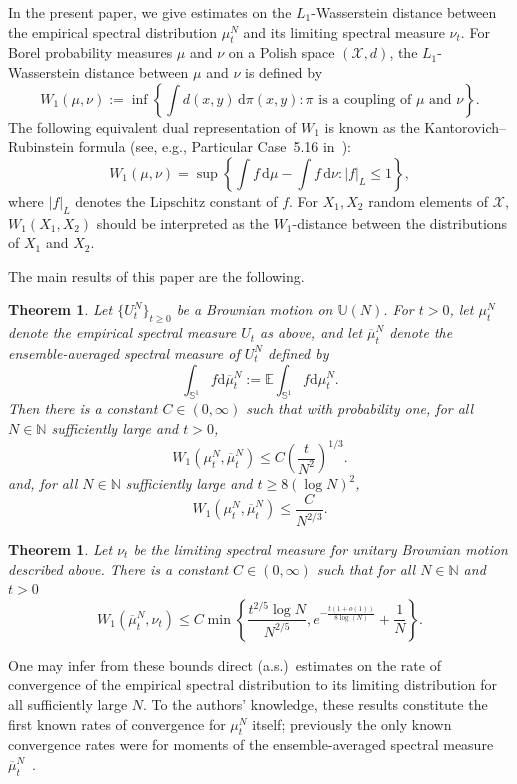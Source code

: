 \documentclass[11pt]{article}
\newtheorem{thm}[theo]{Theorem}
\theoremstyle{definition}
\numberwithin{equation}{section}
\numberwithin{figure}{section}
\numberwithin{table}{section}
\newcommand{\Circle}{\mathbb{S}^1}
\newcommand{\E}{\mathbb{E}}
\newcommand*{\dd}{\mathrm{d}}
\newcommand*{\dmu}{\dd \mu}
\newcommand*{\dbmu}{\dd \overline{\mu}}
\begin{document}
In the present paper, we give estimates on the $L_1$-Wasserstein distance between the empirical spectral distribution $\mu_t^N$ and its limiting spectral measure $\nu_t$. For Borel probability measures $\mu$ and $\nu$ on a Polish space $(\mathcal{X},d)$, the $L_1$-Wasserstein distance between $\mu$ and $\nu$ is defined by
\[
W_1(\mu,\nu):=\inf \left\{\int d(x,y)\,\dd\pi(x,y): \pi \text{ is a coupling of } \mu \text{ and } \nu\right\}.
\]
The following equivalent dual representation of $W_1$ is known as the Kantorovich--Rubinstein formula (see, e.g., Particular Case~5.16 in~\cite{Vil}):
\[
W_1(\mu,\nu) = \sup \left\{\int f\,\dmu -\int f\,\dd\nu : |f|_{L}\le1 \right\},
\]
where $|f|_L$ denotes the Lipschitz constant of $f$. For $X_1,X_2$ random elements of $\mathcal{X}$, $W_1(X_1,X_2)$ should be interpreted as the $W_1$-distance between the distributions of $X_1$ and $X_2$.


The main results of this paper are the following.
\begin{thm}\label{T:main}
Let $\{U^N_t\}_{t\ge0}$ be a Brownian motion on $\mathbb{U}(N)$. For $t>0$, let $\mu_t^N$ denote the empirical spectral measure $U_t$ as above, and let $\overline{\mu}_t^N$ denote the ensemble-averaged spectral measure of $U^N_t$ defined by
\[
\int_{\Circle}f\dbmu^N_t:=\E\int_{\Circle}f\dmu^N_t.
\]
Then there is a constant $C\in(0,\infty)$ such that with probability one, for all $N\in\mathbb{N}$ sufficiently large and $t>0$,
\[
W_1(\mu^N_{t},\overline{\mu}^N_{t})\le C\left(\frac{t}{N^2}\right)^{1/3}.
\]
and, for all $N\in\mathbb{N}$ sufficiently large and $t\ge 8(\log N)^2$,
\[
W_1(\mu^N_{t},\overline{\mu}^N_{t})\le \frac{C}{N^{2/3}}.
\]
\end{thm}

\begin{thm}\label{T:main-nu-t}
Let $\nu_t$ be the limiting spectral measure for unitary Brownian motion described above. There is a constant $C\in(0,\infty)$ such that for all $N\in\mathbb{N}$ and $t>0$
\[
W_1(\overline{\mu}_t^N,\nu_t)\le C\min\left\{\frac{t^{2/5}\log N}{N^{2/5}},e^{-\frac{t(1+o(1))}{8\log(N)}}+\frac{1}{N}\right\}.
\]
\end{thm} One may infer from these bounds direct (a.s.)~estimates on the rate of convergence of the empirical spectral distribution to its limiting distribution for all sufficiently large $N$. To the authors' knowledge, these results constitute the first known rates of convergence for $\mu_t^N$ itself; previously the only known convergence rates were for moments of the ensemble-averaged spectral measure $\overline{\mu}^N_t$~\cite{CDK2016}.
\end{document}
